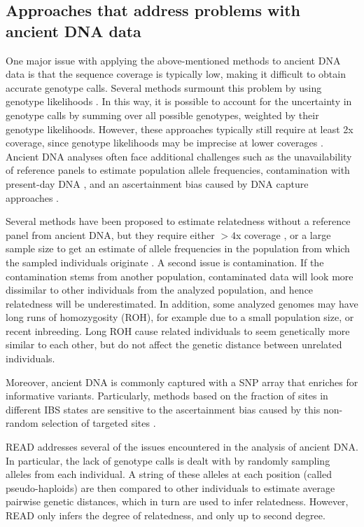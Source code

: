 \documentclass[12pt, letterpaper]{article}
\begin{document}
\subsection{Approaches that address problems with ancient DNA data}
One major issue with applying the above-mentioned methods to ancient DNA data is that the sequence coverage is typically low, making it difficult to obtain accurate genotype calls.
Several methods surmount this problem by using genotype likelihoods \cite{lipatov_maximum_2015,korneliussen_ngsrelate_2015}. In this way, it is possible to account for the uncertainty in genotype calls by summing over all possible genotypes, weighted by their genotype likelihoods. However, these approaches typically still require at least 2x coverage, since genotype likelihoods may be imprecise at lower coverages \cite{korneliussen_angsd_2014} . Ancient DNA analyses often face additional challenges such as the unavailability of  reference panels to estimate population allele frequencies, contamination with present-day DNA \cite{peyregne_present-day_2020-1}, and an ascertainment bias caused by  DNA capture approaches \cite{prufer_computational_2010, vai_kinship_2020}.

Several methods have been proposed to estimate relatedness without a reference panel from ancient DNA, but they  require either $>4$x coverage \cite{waples_allele_2019}, or a large sample size to get an estimate of allele frequencies in the population from which the sampled individuals originate \cite{theunert_joint_2017}. A second issue is contamination. If the contamination stems from another population, contaminated data will look more dissimilar to other individuals from the analyzed population, and hence relatedness will be underestimated. In addition, some analyzed  genomes may have long runs of homozygosity (ROH), for example due to a small population size, or recent inbreeding. Long ROH cause related individuals to seem genetically more similar to each other, but do not affect the genetic distance between unrelated individuals.

Moreover, ancient DNA is commonly captured with a SNP array that enriches for informative variants. Particularly, methods based on the fraction of sites in different IBS states are sensitive to the ascertainment bias caused by this non-random selection of targeted sites \cite{waples_allele_2019}.

READ \cite{kuhn_estimating_2018} addresses several of the issues encountered in the analysis of ancient DNA. In particular, the lack of genotype calls is dealt with by randomly sampling alleles from each individual. A string of these alleles at each position (called pseudo-haploids) are then compared to other individuals to estimate  average pairwise genetic distances, which in turn are used to infer relatedness. However, READ only infers the degree of relatedness, and only up to second degree.
\end{document}
